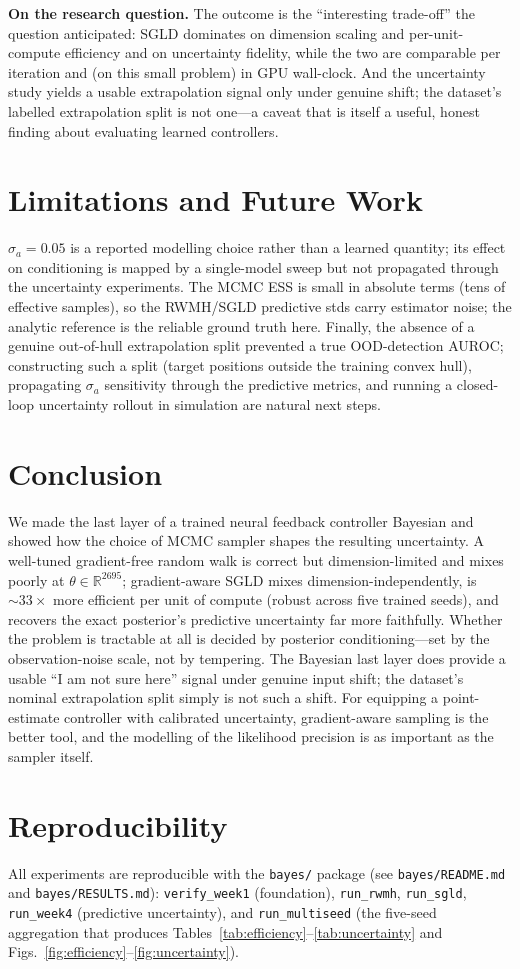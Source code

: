 \documentclass[11pt]{article}
\begin{document}
\textbf{On the research question.} The outcome is the ``interesting trade-off'' the question anticipated:
SGLD dominates on dimension scaling and per-unit-compute efficiency and on uncertainty fidelity, while the
two are comparable per iteration and (on this small problem) in GPU wall-clock. And the uncertainty study
yields a usable extrapolation signal only under genuine shift; the dataset's labelled extrapolation split
is not one---a caveat that is itself a useful, honest finding about evaluating learned controllers.

\section{Limitations and Future Work}
$\sigma_a=0.05$ is a reported modelling choice rather than a learned quantity; its effect on conditioning
is mapped by a single-model sweep but not propagated through the uncertainty experiments. The MCMC ESS is
small in absolute terms (tens of effective samples), so the RWMH/SGLD predictive stds carry estimator
noise; the analytic reference is the reliable ground truth here. Finally, the absence of a genuine
out-of-hull extrapolation split prevented a true OOD-detection AUROC; constructing such a split (target
positions outside the training convex hull), propagating $\sigma_a$ sensitivity through the predictive
metrics, and running a closed-loop uncertainty rollout in simulation are natural next steps.

\section{Conclusion}
We made the last layer of a trained neural feedback controller Bayesian and showed how the choice of MCMC
sampler shapes the resulting uncertainty. A well-tuned gradient-free random walk is correct but
dimension-limited and mixes poorly at $\theta\in\mathbb{R}^{2695}$; gradient-aware SGLD mixes
dimension-independently, is $\sim\!33\times$ more efficient per unit of compute (robust across five
trained seeds), and recovers the exact posterior's predictive uncertainty far more faithfully. Whether
the problem is tractable at all is decided by posterior conditioning---set by the observation-noise scale,
not by tempering. The Bayesian last layer does provide a usable ``I am not sure here'' signal under
genuine input shift; the dataset's nominal extrapolation split simply is not such a shift. For equipping a
point-estimate controller with calibrated uncertainty, gradient-aware sampling is the better tool, and the
modelling of the likelihood precision is as important as the sampler itself.

\section*{Reproducibility}
All experiments are reproducible with the \texttt{bayes/} package (see \texttt{bayes/README.md} and
\texttt{bayes/RESULTS.md}): \texttt{verify\_week1} (foundation), \texttt{run\_rwmh}, \texttt{run\_sgld},
\texttt{run\_week4} (predictive uncertainty), and \texttt{run\_multiseed} (the five-seed aggregation that
produces Tables~\ref{tab:efficiency}--\ref{tab:uncertainty} and Figs.~\ref{fig:efficiency}--\ref{fig:uncertainty}).
\end{document}
